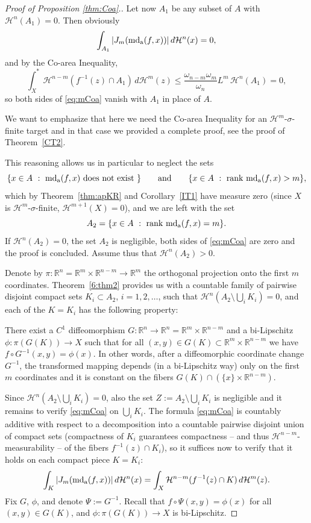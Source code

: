 \documentclass[12pt,leqno]{amsart}
\theoremstyle{definition}
\newcommand{\bbbr}{\mathbb R}
\def\H{{\mathcal H}}
\def\rank{{\rm rank\,}}
\def\apmd{\operatorname{md_{\rm a}}}
\numberwithin{theorem}{section} \numberwithin{equation}{section}
\begin{document}
\begin{proof}[Proof of Proposition \ref{thm:Coa}.]
Let now $A_1$ be any subset of $A$ with $\H^n(A_1)=0$. Then obviously
$$\int_{A_1}|J_m(\apmd(f,x))|\,d\H^n(x)=0,$$ and by the Co-area Inequality,
$$\int^*_X \mathcal{H}^{n-m} \left(f^{-1}(z) \cap A_1\right)\,  d\mathcal{H}^m (z)  \leq \frac{\omega_{n-m} \omega_m}{\omega_{n}}L^m \,\mathcal{H}^{n}(A_1)=0,$$
so both sides of \eqref{eq:mCoa} vanish with $A_1$ in place of $A$.

We want to emphasize that here we need the Co-area Inequality for an $\H^m$-$\sigma$-finite target and in that case we provided a complete proof, see the proof of Theorem~\ref{CT2}.

This reasoning allows us in particular to neglect the sets
$$
\{x\in A~:~\apmd (f,x) \text{ does not exist }\}
\qquad
\text{and}
\qquad
\{x\in A~:~\rank \apmd(f,x)>m\},
$$
which by Theorem~\ref{thm:apKR} and Corollary~\ref{IT1} have measure zero (since $X$ is $\H^m$-$\sigma$-finite, $\H^{m+1}(X)=0$), and we are left with the set $$A_2=\{x\in A~:~\rank\apmd (f,x)=m\}.$$
If $\H^n(A_2)=0$, the set $A_2$ is negligible, both sides of \eqref{eq:mCoa} are zero and the proof is concluded. Assume thus that $\H^n(A_2)>0$.

Denote by $\pi:\bbbr^{n}=\bbbr^m\times\bbbr^{n-m}\to\bbbr^m$ the orthogonal projection onto the first $m$ coordinates. Theorem~\ref{6:thm2} provides us with a countable family of pairwise disjoint compact sets $K_i\subset A_2$, $i=1,2,\ldots$, such that $\H^n(A_2\setminus \bigcup_i K_i)=0$, and each of the $K=K_i$ has the following property:

There exist a $C^1$ diffeomorphism $G:\bbbr^n\to\bbbr^n=\bbbr^m\times\bbbr^{n-m}$ and a bi-Lipschitz $\phi:\pi(G(K)) \to X$ such that for all $(x,y)\in G(K)\subset \bbbr^m\times\bbbr^{n-m}$ we have $f\circ G^{-1}(x,y)=\phi(x)$. In other words, after a diffeomorphic coordinate change $G^{-1}$, the transformed mapping depends (in a bi-Lipschitz way) only on the first $m$ coordinates and it is constant on the fibers $G(K)\cap (\{x\}\times \bbbr^{n-m})$.

Since  $\H^n(A_2\setminus \bigcup_i K_i)=0$, also the set $Z:=A_2\setminus \bigcup_i K_i$ is negligible and it remains to verify \eqref{eq:mCoa} on $\bigcup_i K_i$. The formula \eqref{eq:mCoa} is countably additive with respect to a decomposition into a countable pairwise disjoint union of compact sets (compactness of $K_i$ guarantees compactness -- and thus $\H^{n-m}$-measurability -- of the fibers $f^{-1}(z)\cap K_i$), so it suffices now to verify that it holds on each compact piece $K=K_i$:
\begin{equation}\label{eq:coAonK}
\int_K |J_m(\apmd(f,x))|\,d\H^n(x)=\int_X \H^{n-m}(f^{-1}(z)\cap K)\,d\H^m(z).
\end{equation}
Fix $G$, $\phi$, and denote $\Psi:=G^{-1}$.
Recall that $f\circ\Psi(x,y)=\phi(x)$ for all $(x,y)\in G(K)$, and $\phi:\pi(G(K))\to X$ is bi-Lipschitz.


\end{proof}
\end{document}
